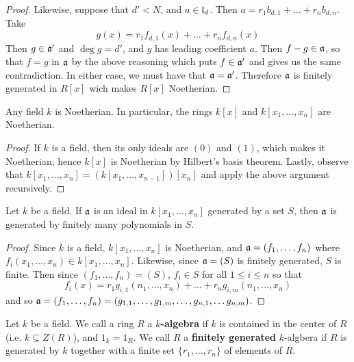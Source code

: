 \begin{proof}
  Likewise, suppose that $d'<N$, and  $a \in \mathfrak{l}_d$. Then
  $a=r_1b_{d,1}+\dots+r_nb_{d,n}$. Take
  \begin{equation*}
    g(x)=r_1f_{d,1}(x)+\dots+r_nf_{d,n}(x)
  \end{equation*}
  Then $g \in \mathfrak{a}'$ and $\deg{g}=d'$, and $g$ has leading coefficient
  $a$. Then $f-g \in \mathfrak{a}$, so that $f=g$ in $\mathfrak{a}$ by the above
  reasoning which puts  $f \in \mathfrak{a}'$ and gives us the same
  contradiction. In either case, we must have that $\mathfrak{a}=\mathfrak{a}'$.
  Therefore $\mathfrak{a}$ is finitely generated in $R[x]$ wich makes $R[x]$
  Noetherian.
\end{proof}
\begin{corollary}
  Any field $k$ is Noetherian. In particular, the rings $k[x]$ and
  $k[x_1, \dots, x_n]$ are Noetherian.
\end{corollary}
\begin{proof}
  If $k$ is a field, then its only ideals are $(0)$ and $(1)$, which
  makes it Noetherian; hence $k[x]$ is Noetherian by Hilbert's basis
  theorem. Lastly, observe that $k[x_1, \dots, x_n]=(k[x_1, \dots,
  x_{n-1}])[x_n]$ and apply the above argument recursively.
\end{proof}
\begin{corollary}
  Let $k$ be a field. If $\mathfrak{a}$ is an ideal in $k[x_1, \dots, x_n]$ generated
  by a set $S$, then $\mathfrak{a}$ is generated by finitely many polynomials in $S$.
\end{corollary}
\begin{proof}
  Since $k$ is a field, $k[x_1, \dots, x_n]$ is Noetherian, and
  $\mathfrak{a}=(f_1, \dots, f_n)$ where $f_i(x_1, \dots ,x_n) \in k[x_1,
  \dots, x_n]$. Likewise, since $\mathfrak{a}=(S)$ is finitely generated, $S$
  is finite. Then since $(f_1, \dots, f_n)=(S)$, $f_i \in S$ for all
  $1 \leq i \leq n$ so that
  \begin{equation*}
    f_i(x)=r_1g_{i,1}(n_1, \dots, x_n)+\dots+r_ng_{i,m}(n_1, \dots, x_n)
  \end{equation*}
  and so $\mathfrak{a}=(f_1, \dots, f_n)=(g_{1,1}, \dots ,g_{1,m}, \dots,
  g_{n,1}, \dots g_{n,m})$.
\end{proof}


\begin{definition}
  Let $k$ be a field. We call a ring  $R$ a \textbf{$k$-algebra} if $k$ is
  contained in the center of  $R$  (i.e. $k \subseteq Z(R)$), and $1_k=1_R$.
  We call  $R$ a  \textbf{finitely generated} $k$-algbera if $R$ is generated
  by  $k$ together with a finite set $\{r_1, \dots, r_n\}$ of elements of
  $R$.
\end{definition}

